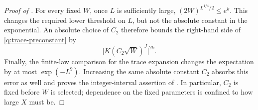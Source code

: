 \begin{proof}[Proof of ]
For every fixed $W$, once $L$ is sufficiently large,
$(2W)^{L^{1/4}/2}\le e^k$.  This changes the required lower threshold
on $L$, but not the absolute constant in the exponential.  An
absolute choice of $C_2$ therefore bounds the right-hand side of
\eqref{q:trace-preconstant} by
\[
 \bigl[K(C_2\sqrt W)^J\bigr]^{2k}.
\]
Finally, the finite-law comparison for the trace expansion changes
the expectation by at most $\exp(-L^9)$.  Increasing the same
absolute constant $C_2$ absorbs this error as well and proves the
integer-interval assertion of .  In particular,
$C_2$ is fixed before $W$ is selected; dependence on the fixed
parameters is confined to how large $X$ must be.
\end{proof}
